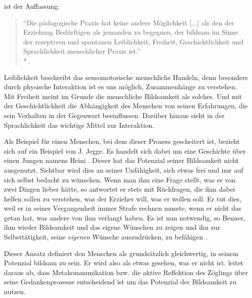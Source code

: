 \citeauthor{benner-2012} ist der Auffassung:

\begin{quote}
	``Die pädagogische Praxis hat keine andere Möglichkeit [...] als den der Erziehung Bedürftigen als jemanden zu begegnen, der bildsam im Sinne der rezeptiven und spontanen Leiblichkeit, Freiheit, Geschichtlichkeit und Sprachlichkeit menschlicher Praxis ist.''\\*
	\textcite[vgl.][76]{benner-2012}.
\end{quote}

Leiblichkeit beschreibt das sensomotorische menschliche Handeln, denn besonders durch physische Interaktion ist es uns möglich, Zusammenhänge zu verstehen.
Mit Freiheit meint \citeauthor{benner-2012} im Grunde die menschliche Bildsamkeit als solches.
Und mit der Geschichtlichkeit die Abhängigkeit des Menschen von seinen Erfahrungen, die sein Verhalten in der Gegenwart beeinflussen.
Darüber hinaus sieht \citeauthor{benner-2012} in der Sprachlichkeit das wichtige Mittel zur Interaktion.

Als Beispiel für einen Menschen, bei dem dieser Prozess gescheitert ist, bezieht sich \citeauthor{benner-2012} auf ein Beispiel von J. Jegge.
Es handelt sich dabei um eine Geschichte über einen Jungen namens Heini \parencite[vgl.][74]{benner-2012}.
Dieser hat das Potenzial seiner Bildsamkeit nicht ausgenutzt.
Sichtbar wird dies an seiner Unfähigkeit, sich etwas frei und nur auf sich selbst bedacht zu wünschen.
Wenn man ihm eine Frage stellt, was er von zwei Dingen lieber hätte, so antwortet er stets mit Rückfragen, die ihm dabei helfen sollen zu verstehen, was der Erzieher will, was er wollen soll.
Er tut dies, weil er in seiner Vergangenheit immer Strafe rechnen musste, wenn er nicht das getan hat, was andere von ihm verlangt haben.
Es ist nun notwendig, so Benner, ihm wieder Bildsamkeit und das eigene Wünschen zu zeigen und ihn zur Selbsttätigkeit, seine \emph{eigenen} Wünsche auszudrücken, zu befähigen \parencite[vgl.][20]{benner-2012}.

Dieser Ansatz definiert den Menschen als grundsätzlich gleichwertig, in seinem Potenzial bildsam zu sein.
Er wird also als etwas gesehen, was er nicht ist.
\citeauthor{benner-2012} leitet daraus ab, dass Metakommunikation bzw. die aktive Reflektion des Zöglings über seine Gedankenprozesse entscheidend ist um das Potenzial der Bildsamkeit zu nutzen.
